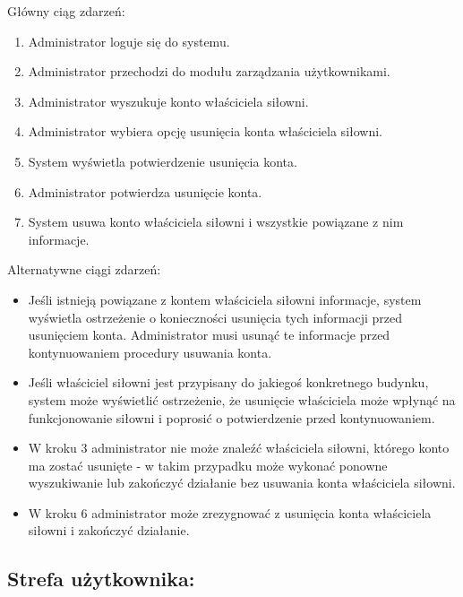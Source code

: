 \documentclass[
]{article}
\providecommand{\tightlist}{%
  \setlength{\itemsep}{0pt}\setlength{\parskip}{0pt}}
\begin{document}
{Główny ciąg zdarzeń:}

\begin{enumerate}
\tightlist
\item
  {Administrator loguje się do systemu.}
\item
  {Administrator przechodzi do modułu zarządzania użytkownikami.}
\item
  {Administrator wyszukuje konto właściciela siłowni.}
\item
  {Administrator wybiera opcję usunięcia konta właściciela siłowni.}
\item
  {System wyświetla potwierdzenie usunięcia konta.}
\item
  {Administrator potwierdza usunięcie konta.}
\item
  {System usuwa konto właściciela siłowni i wszystkie powiązane z nim
  informacje.}
\end{enumerate}

{Alternatywne ciągi zdarzeń:}

\begin{itemize}
\tightlist
\item
  {Jeśli istnieją powiązane z kontem właściciela siłowni informacje,
  system wyświetla ostrzeżenie o konieczności usunięcia tych informacji
  przed usunięciem konta. Administrator musi usunąć te informacje przed
  kontynuowaniem procedury usuwania konta.}
\item
  {Jeśli właściciel siłowni jest przypisany do jakiegoś konkretnego
  budynku, system może wyświetlić ostrzeżenie, że usunięcie właściciela
  może wpłynąć na funkcjonowanie siłowni i poprosić o potwierdzenie
  przed kontynuowaniem.}
\item
  {W kroku 3 administrator nie może znaleźć właściciela siłowni, którego
  konto ma zostać usunięte - w takim przypadku może wykonać ponowne
  wyszukiwanie lub zakończyć działanie bez usuwania konta właściciela
  siłowni.}
\item
  {W kroku 6 administrator może zrezygnować z usunięcia konta
  właściciela siłowni i zakończyć działanie.}
\end{itemize}

{}

{}

{}

\hypertarget{h.53mnna977pi7}{%
\subsection{\texorpdfstring{{Strefa
użytkownika:}}{Strefa użytkownika:}}\label{h.53mnna977pi7}}
\end{document}
